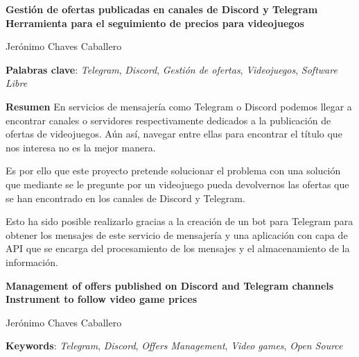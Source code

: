 \thispagestyle{empty}

\begin{center}
{\large\bfseries Gestión de ofertas publicadas en canales de Discord y Telegram \\ Herramienta para el seguimiento de precios para videojuegos }\\
\end{center}
\begin{center}
Jerónimo Chaves Caballero\\
\end{center}


\vspace{0.5cm}
\noindent\textbf{Palabras clave}: \textit{Telegram}, \textit{Discord}, \textit{Gestión de ofertas}, \textit{Videojuegos}, \textit{Software Libre}
\vspace{0.7cm}

\noindent\textbf{Resumen}
En servicios de mensajería como Telegram o Discord podemos llegar a encontrar 
canales o servidores respectivamente dedicados a la publicación de ofertas de
videojuegos. Aún así, navegar entre ellas para encontrar el título que nos interesa 
no es la mejor manera.

Es por ello que este proyecto pretende solucionar el problema con una solución que
mediante se le pregunte por un videojuego pueda devolvernos las ofertas que se han 
encontrado en los canales de Discord y Telegram.

Esto ha sido posible realizarlo gracias a la creación de un bot para Telegram para 
obtener los mensajes de este servicio de mensajería y una aplicación con capa de 
API que se encarga del procesamiento de los mensajes y el almacenamiento de la 
información.

\cleardoublepage

\begin{center}
	{\large\bfseries Management of offers published on Discord and Telegram channels \\ Instrument to follow video game prices}\\
\end{center}
\begin{center}
	Jerónimo Chaves Caballero\\
\end{center}
\vspace{0.5cm}
\noindent\textbf{Keywords}: \textit{Telegram}, \textit{Discord}, \textit{Offers Management}, \textit{Video games}, \textit{Open Source}
\vspace{0.7cm}

